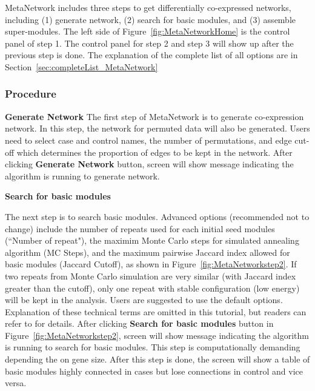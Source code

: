 MetaNetwork includes three steps to get differentially co-expressed networks,
including (1) generate network, (2) search for basic modules, and (3) assemble super-modules. 
The left side of Figure~\ref{fig:MetaNetworkHome} is the control panel of step 1. 
The control panel for step 2 and step 3 will show up after the previous step is done.
The explanation of the complete list of all options are in Section~\ref{sec:completeList_MetaNetwork}


\subsubsection{Procedure}

\begin{steps}
\item \textbf{Generate Network}
The first step of MetaNetwork is to generate co-expression network. 
In this step, the network for permuted data will also be generated. 
Users need to select case and control names, the number of permutations, and edge cut-off which determines the proportion of edges to be kept in the network. 
After clicking \textbf{Generate Network} button, screen will show message indicating the algorithm is running to generate network.

\item \textbf{Search for basic modules}

The next step is to search basic modules.
Advanced options (recommended not to change) include the number of repeats used for each initial seed modules (``Number of repeat"),
the maximim Monte Carlo steps for simulated annealing algorithm (MC Steps),
and the maximum pairwise Jaccard index allowed for basic modules (Jaccard Cutoff), as shown in Figure~\ref{fig:MetaNetworkstep2}.
If two repeats from Monte Carlo simulation are very similar (with Jaccard index greater than the cutoff),
only one repeat with stable configuration (low energy) will be kept in the analysis.
Users are suggested to use the default options.
Explanation of these technical terms are omitted in this tutorial,
but readers can refer to \cite{zhu2016metadcn} for details.
After clicking \textbf{Search for basic modules} button in Figure~\ref{fig:MetaNetworkstep2}, 
screen will show message indicating the algorithm is running to search for basic modules.
This step is computationally demanding depending the on gene size.
After this step is done,
the screen will show a table of basic modules highly connected in cases but lose connections in control and vice versa.



\end{steps}
